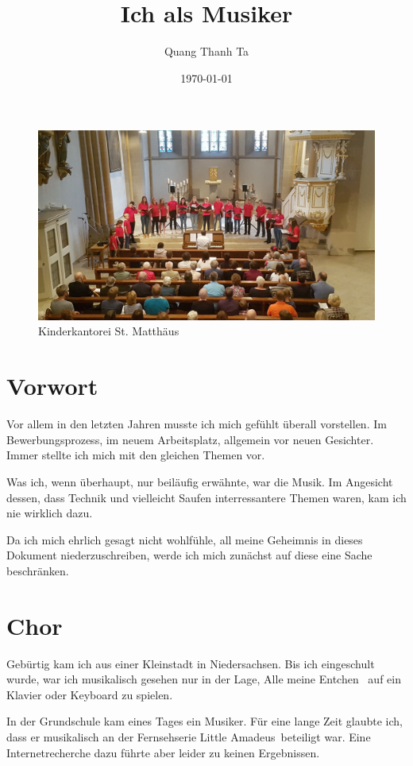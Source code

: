 \documentclass{scrartcl}
\title{ Ich als Musiker }
\author{ Quang Thanh Ta }
\date{\today}
\begin{document}
\maketitle

\begin{figure}[h]
\includegraphics[width=\textwidth]{images/chor.jpg}
\caption{Kinderkantorei St. Matthäus}
\end{figure}

\section{Vorwort}
Vor allem in den letzten Jahren musste ich mich gefühlt überall vorstellen. Im
Bewerbungsprozess, im neuem Arbeitsplatz, allgemein vor neuen Gesichter. Immer
stellte ich mich mit den gleichen Themen vor.

Was ich, wenn überhaupt, nur beiläufig erwähnte, war die Musik. Im Angesicht
dessen, dass Technik und vielleicht Saufen interressantere Themen waren, kam ich
nie wirklich dazu.

Da ich mich ehrlich gesagt nicht wohlfühle, all meine Geheimnis in dieses
Dokument niederzuschreiben, werde ich mich zunächst auf diese eine Sache
beschränken.

\section{Chor}
Gebürtig kam ich aus einer Kleinstadt in Niedersachsen. Bis ich eingeschult 
wurde, war ich musikalisch gesehen nur in der Lage, \glqq Alle meine Entchen
\grqq\ auf ein Klavier oder Keyboard zu spielen.

In der Grundschule kam eines Tages ein Musiker. Für eine lange Zeit glaubte ich, 
dass er musikalisch an der Fernsehserie \glqq Little Amadeus\grqq\ beteiligt
war. Eine Internetrecherche dazu führte aber leider zu keinen Ergebnissen.
\end{document}
